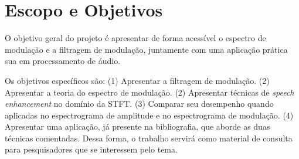 \section{Escopo e Objetivos}

O objetivo geral do projeto é apresentar de forma acessível o espectro de
modulação e a filtragem de modulação, juntamente com uma aplicação prática sua
em processamento de áudio. 

Os objetivos específicos são: (1) Apresentar a filtragem de modulação. (2)
Apresentar a teoria do espectro de modulação. (2) Apresentar técnicas de
\textit{speech enhancement} no domínio da STFT. (3)
Comparar seu desempenho quando aplicadas no espectrograma de amplitude e no
espectrograma de modulação. (4) Apresentar uma aplicação, já presente na
bibliografia, que aborde as duas técnicas comentadas. Dessa forma, o trabalho
servirá como material de consulta para pesquisadores que se interessem pelo
tema.